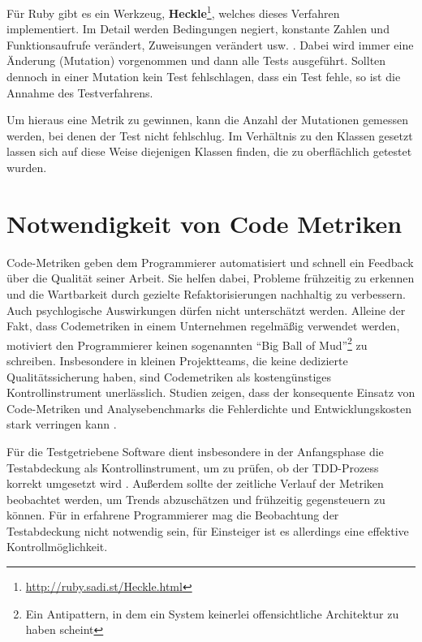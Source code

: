  Für Ruby gibt es ein Werkzeug, \textbf{Heckle}\footnote{\url{http://ruby.sadi.st/Heckle.html}}, welches dieses Verfahren implementiert. Im Detail werden Bedingungen negiert, konstante Zahlen und Funktionsaufrufe verändert, Zuweisungen verändert usw. \citep{ruby_sadists_confessions_2010}. Dabei wird immer eine Änderung (Mutation) vorgenommen und dann alle Tests ausgeführt. Sollten dennoch in einer Mutation kein Test fehlschlagen, dass ein Test fehle, so ist die Annahme des Testverfahrens.

 Um hieraus eine Metrik zu gewinnen, kann die Anzahl der Mutationen gemessen werden, bei denen der Test nicht fehlschlug. Im Verhältnis zu den Klassen gesetzt lassen sich auf diese Weise diejenigen Klassen finden, die zu oberflächlich getestet wurden.
 \section{Notwendigkeit von Code Metriken}

 Code-Metriken geben dem Programmierer automatisiert und schnell ein Feedback über die Qualität seiner Arbeit. Sie helfen dabei, Probleme frühzeitig zu erkennen und die Wartbarkeit durch gezielte Refaktorisierungen nachhaltig zu verbessern. Auch psychlogische Auswirkungen dürfen nicht unterschätzt werden. Alleine der Fakt, dass Codemetriken in einem Unternehmen regelmäßig verwendet werden, motiviert den Programmierer keinen sogenannten "`Big Ball of Mud"'\footnote{Ein Antipattern, in dem ein System keinerlei offensichtliche Architektur zu haben scheint} zu schreiben. Insbesondere in kleinen Projektteams, die keine dedizierte Qualitätssicherung haben, sind Codemetriken als kostengünstiges Kontrollinstrument unerlässlich. Studien zeigen, dass der konsequente Einsatz von Code-Metriken und Analysebenchmarks die Fehlerdichte und Entwicklungskosten stark verringen kann \citep[S.10f]{baggen_standardized_2011}.

 Für die Testgetriebene Software dient insbesondere in der Anfangsphase die Testabdeckung als Kontrollinstrument, um zu prüfen, ob der TDD-Prozess korrekt umgesetzt wird \citep[S. 300]{nagappan_realizing_2008}. Außerdem sollte der zeitliche Verlauf der Metriken beobachtet werden, um Trends abzuschätzen und frühzeitig gegensteuern zu können. Für in  erfahrene Programmierer mag die Beobachtung der Testabdeckung nicht notwendig sein, für Einsteiger ist es allerdings eine effektive Kontrollmöglichkeit.

